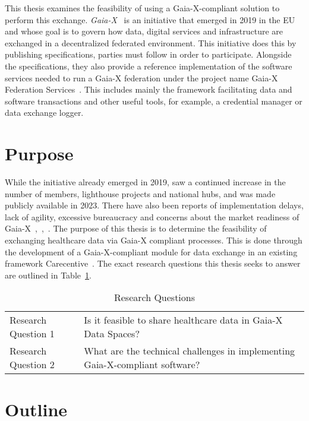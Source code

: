 This thesis examines the feasibility of using a Gaia-X-compliant solution to perform this exchange.
\textit{Gaia-X}~\cite{gaiax} is an initiative that emerged in 2019 in the EU and whose goal is to govern how data, digital services and infrastructure are exchanged in a decentralized federated environment.
This initiative does this by publishing specifications, parties must follow in order to participate.
Alongside the specifications, they also provide a reference implementation of the software services needed to run a Gaia-X federation under the project name Gaia-X Federation Services~\cite{gxfs}.
This includes mainly the framework facilitating data and software transactions and other useful tools, for example, a credential manager or data exchange logger.

\section{Purpose}\label{sec:purpose}

While the initiative already emerged in 2019, saw a continued increase in the number of members, lighthouse projects and national hubs, and was made publicly available in 2023.
There have also been reports of implementation delays, lack of agility, excessive bureaucracy and concerns about the market readiness of Gaia-X~\cite{say_gaia-x_2024},~\cite{noauthor_inside_2021},~\cite{eichberger_why_2021}.
The purpose of this thesis is to determine the feasibility of exchanging healthcare data via Gaia-X compliant processes.
This is done through the development of a Gaia-X-compliant module for data exchange in an existing framework Carecentive~\cite{carecentive}.
The exact research questions this thesis seeks to answer are outlined in Table~\ref{tab:research-questions}.

\begin{table}
    \centering
    {\renewcommand{\arraystretch}{1.7}
        \begin{tabular}{ p{4cm}|p{11cm} }
            Research Question 1 & Is it feasible to share healthcare data in Gaia-X Data Spaces?\\
            \hhline{--}
            Research Question 2 & What are the technical challenges in implementing Gaia-X-compliant software?
        \end{tabular}
    }
    \caption{Research Questions}
    \label{tab:research-questions}
\end{table}

\section{Outline}\label{sec:outline}

